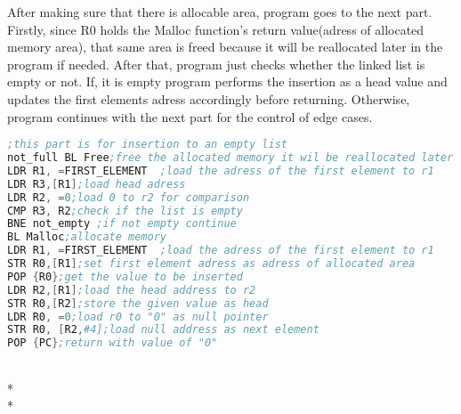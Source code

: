 \documentclass[pdftex,12pt,a4paper]{article}
\begin{document}
\quad After making sure that there is allocable area, program goes to the next part. Firstly, since R0 holds the Malloc function's return value(adress of allocated memory area), that same area is freed because it will be reallocated later in the program if needed. After that, program just checks whether the linked list is empty or not. If, it is empty program performs the insertion as a head value and updates the first elements adress accordingly before returning. Otherwise, program continues with the next part for the control of edge cases.
\begin{lstlisting}[language=Assembler]
;this part is for insertion to an empty list
not_full BL Free;free the allocated memory it wil be reallocated later
LDR R1, =FIRST_ELEMENT	;load the adress of the first element to r1
LDR R3,[R1];load head adress
LDR R2, =0;load 0 to r2 for comparison
CMP R3, R2;check if the list is empty
BNE	not_empty ;if not empty continue
BL Malloc;allocate memory
LDR R1, =FIRST_ELEMENT	;load the adress of the first element to r1
STR R0,[R1];set first element adress as adress of allocated area
POP {R0};get the value to be inserted
LDR R2,[R1];load the head address to r2
STR R0,[R2];store the given value as head
LDR R0, =0;load r0 to "0" as null pointer
STR R0, [R2,#4];load null address as next element
POP {PC};return with value of "0"
\end{lstlisting}\\*\\*
\end{document}
